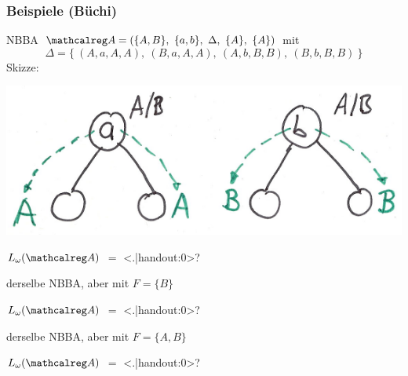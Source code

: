 \begin{frame}
  \frametitle{Beispiele (Büchi)}

  \begin{Itemize}
    \item<+->
      NBBA $\Aut{A}=(\{A,B\},~\{a,b\},~\Delta,~\{A\},~\{A\})$ mit %
      \[
        \Delta = \{~(A,a,A,A),~(B,a,A,A),~(A,b,B,B),~(B,b,B,B)~\}
      \]
      Skizze:
      \par\vspace*{-\baselineskip}
      \begin{center}
        \includegraphics[scale=.5]{img/beispielautomaten_1.pdf}
      \end{center}

      \par\bigskip
      $L_\omega(\Aut{A})$ $=$
      \only<.|handout:0>{?}%
      \par\bigskip
    \item<+->
      derselbe NBBA, aber mit $F=\{B\}$
      \par\smallskip
      $L_\omega(\Aut{A})$ $=$
      \only<.|handout:0>{?}%
      \par\bigskip
    \item<+->
      derselbe NBBA, aber mit $F=\{A,B\}$
      \par\smallskip
      $L_\omega(\Aut{A})$ $=$
      \only<.|handout:0>{?}%
  \end{Itemize}

\end{frame}

